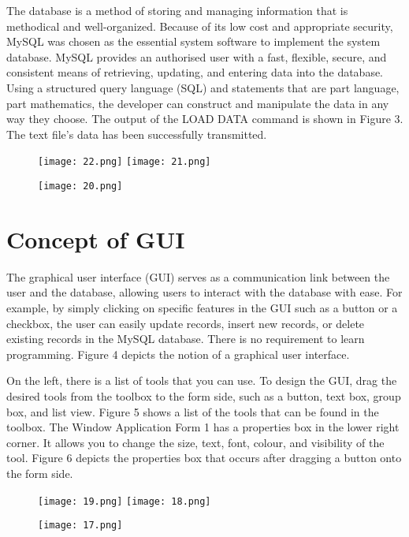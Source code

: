 \documentclass[10pt,a4paper,twoside]{article}
\begin{document}
\vspace{0.3cm}

The database is a method of storing and managing information that is methodical and well-organized.
Because of its low cost and appropriate security, MySQL was chosen as the essential system software to implement the system database. MySQL provides an authorised user with a fast, flexible, secure, and consistent means of retrieving, updating, and entering data into the database.
Using a structured query language (SQL) and statements that are part language, part mathematics, the developer can construct and manipulate the data in any way they choose.
The output of the LOAD DATA command is shown in Figure 3. The text file's data has been successfully transmitted.

\begin{figure}
  \texttt{[image: 22.png]}
    \texttt{[image: 21.png]}
  
  \texttt{[image: 20.png]}
  
  
  
\end{figure}

\section{Concept of GUI}

The graphical user interface (GUI) serves as a communication link between the user and the database, allowing users to interact with the database with ease. For example, by simply clicking on specific features in the GUI such as a button or a checkbox, the user can easily update records, insert new records, or delete existing records in the MySQL database. There is no requirement to learn programming. Figure 4 depicts the notion of a graphical user interface.
\vspace{0.3cm}

On the left, there is a list of tools that you can use.
To design the GUI, drag the desired tools from the toolbox to the form side, such as a button, text box, group box, and list view. Figure 5 shows a list of the tools that can be found in the toolbox.
The Window Application Form 1 has a properties box in the lower right corner. It allows you to change the size, text, font, colour, and visibility of the tool. Figure 6 depicts the properties box that occurs after dragging a button onto the form side.

\begin{figure}
  \texttt{[image: 19.png]}
    \texttt{[image: 18.png]}
  
  \texttt{[image: 17.png]}
  
  
  
\end{figure}
\end{document}
